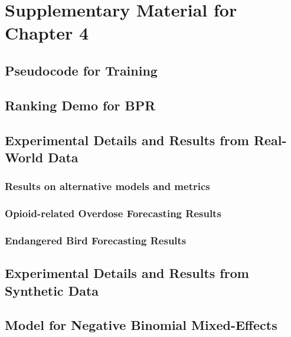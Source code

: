 \section{Supplementary Material for Chapter 4}\label{supplementary-material-ch4}
\graphicspath{{content/chapters/daml/}}

\subsection{Pseudocode for Training}


\subsection{Ranking Demo for BPR}
\label{supp:ranking_demo}


\subsection{Experimental Details and Results from Real-World Data}
\label{supp:real_data}


\subsubsection{Results on alternative models and metrics}
\label{supp:metrics_models}


\subsubsection{Opioid-related Overdose Forecasting Results}
\label{supp:results_opioids}


\subsubsection{Endangered Bird Forecasting Results}
\label{supp:results_birds}


\subsection{Experimental Details and Results from Synthetic Data}
\label{supp:synth1D}


\subsection{Model for Negative Binomial Mixed-Effects}
\label{supp:model_negbinom}

\graphicspath{{./}}

